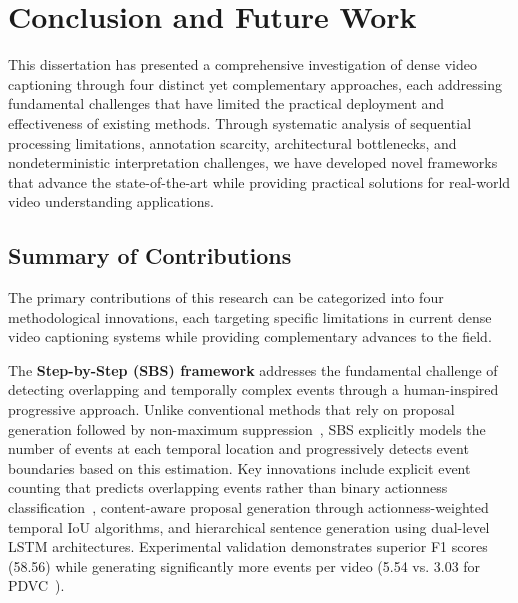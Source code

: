 
\chapter{Conclusion and Future Work}
\label{chap:conclusions}

This dissertation has presented a comprehensive investigation of dense video captioning through four distinct yet complementary approaches, each addressing fundamental challenges that have limited the practical deployment and effectiveness of existing methods. Through systematic analysis of sequential processing limitations, annotation scarcity, architectural bottlenecks, and nondeterministic interpretation challenges, we have developed novel frameworks that advance the state-of-the-art while providing practical solutions for real-world video understanding applications.

\section{Summary of Contributions}
\label{sec:summary_contributions}

The primary contributions of this research can be categorized into four methodological innovations, each targeting specific limitations in current dense video captioning systems while providing complementary advances to the field.

The \textbf{Step-by-Step (SBS) framework} addresses the fundamental challenge of detecting overlapping and temporally complex events through a human-inspired progressive approach. Unlike conventional methods that rely on proposal generation followed by non-maximum suppression~\cite{Krishna2017-pw,Li2018-ll}, SBS explicitly models the number of events at each temporal location and progressively detects event boundaries based on this estimation. Key innovations include explicit event counting that predicts overlapping events rather than binary actionness classification~\cite{lin2018bsn}, content-aware proposal generation through actionness-weighted temporal IoU algorithms, and hierarchical sentence generation using dual-level LSTM architectures. Experimental validation demonstrates superior F1 scores (58.56) while generating significantly more events per video (5.54 vs. 3.03 for PDVC~\cite{Wang2021-zi}).

